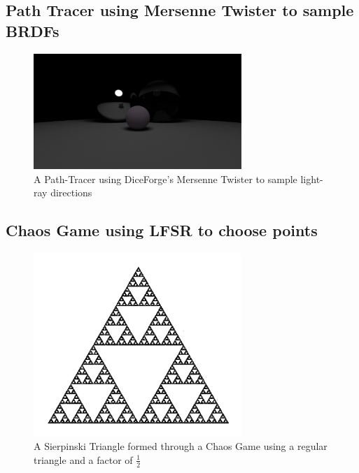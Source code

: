 \documentclass[titlepage, 11pt]{article}
\begin{document}
\subsection{Path Tracer using Mersenne Twister to sample BRDFs}
\begin{figure}[!ht]
    \centering
    \includegraphics[width=0.7\textwidth]{images/path_tracer.pdf}
    \caption{A Path-Tracer using DiceForge's Mersenne Twister to sample light-ray directions}
    \label{fig:example-path-tracer}
\end{figure}
\newpage
\subsection{Chaos Game using LFSR to choose points}
\begin{figure}[!ht]
    \centering
    \includegraphics[width=0.7\textwidth]{images/sierpinski_triangle.pdf}
    \caption{A Sierpinski Triangle formed through a Chaos Game using a regular triangle and a factor of $\frac{1}{2}$}
    \label{fig:example-sierpinski-chaos}
\end{figure}
\end{document}

